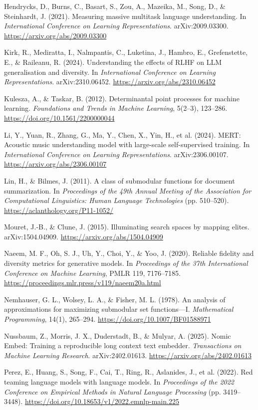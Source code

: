 \documentclass[
  10pt,
]{article}
\theoremstyle{plain}
\theoremstyle{definition}
\begin{document}
Hendrycks, D., Burns, C., Basart, S., Zou, A., Mazeika, M., Song, D., \&
Steinhardt, J. (2021). Measuring massive multitask language
understanding. In \emph{International Conference on Learning
Representations}. arXiv:2009.03300.
\url{https://arxiv.org/abs/2009.03300}

Kirk, R., Mediratta, I., Nalmpantis, C., Luketina, J., Hambro, E.,
Grefenstette, E., \& Raileanu, R. (2024). Understanding the effects of
RLHF on LLM generalisation and diversity. In \emph{International
Conference on Learning Representations}. arXiv:2310.06452.
\url{https://arxiv.org/abs/2310.06452}

Kulesza, A., \& Taskar, B. (2012). Determinantal point processes for
machine learning. \emph{Foundations and Trends in Machine Learning},
5(2--3), 123--286. \url{https://doi.org/10.1561/2200000044}

Li, Y., Yuan, R., Zhang, G., Ma, Y., Chen, X., Yin, H., et al. (2024).
MERT: Acoustic music understanding model with large-scale
self-supervised training. In \emph{International Conference on Learning
Representations}. arXiv:2306.00107.
\url{https://arxiv.org/abs/2306.00107}

Lin, H., \& Bilmes, J. (2011). A class of submodular functions for
document summarization. In \emph{Proceedings of the 49th Annual Meeting
of the Association for Computational Linguistics: Human Language
Technologies} (pp. 510--520). \url{https://aclanthology.org/P11-1052/}

Mouret, J.-B., \& Clune, J. (2015). Illuminating search spaces by
mapping elites. arXiv:1504.04909. \url{https://arxiv.org/abs/1504.04909}

Naeem, M. F., Oh, S. J., Uh, Y., Choi, Y., \& Yoo, J. (2020). Reliable
fidelity and diversity metrics for generative models. In
\emph{Proceedings of the 37th International Conference on Machine
Learning}, PMLR 119, 7176--7185.
\url{https://proceedings.mlr.press/v119/naeem20a.html}

Nemhauser, G. L., Wolsey, L. A., \& Fisher, M. L. (1978). An analysis of
approximations for maximizing submodular set functions---I.
\emph{Mathematical Programming}, 14(1), 265--294.
\url{https://doi.org/10.1007/BF01588971}

Nussbaum, Z., Morris, J. X., Duderstadt, B., \& Mulyar, A. (2025). Nomic
Embed: Training a reproducible long context text embedder.
\emph{Transactions on Machine Learning Research}. arXiv:2402.01613.
\url{https://arxiv.org/abs/2402.01613}

Perez, E., Huang, S., Song, F., Cai, T., Ring, R., Aslanides, J., et al.
(2022). Red teaming language models with language models. In
\emph{Proceedings of the 2022 Conference on Empirical Methods in Natural
Language Processing} (pp. 3419--3448).
\url{https://doi.org/10.18653/v1/2022.emnlp-main.225}
\end{document}

